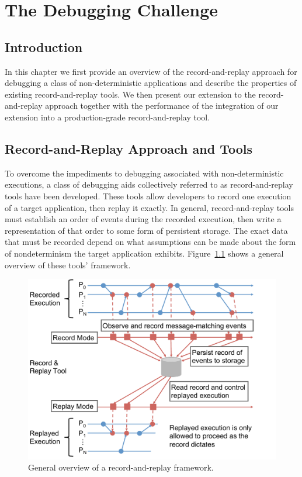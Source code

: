 \chapter{The Debugging Challenge} \label{chap3}

\section{Introduction}

In this chapter we first provide an overview of the record-and-replay
approach for debugging a class of non-deterministic applications and
describe the properties of existing record-and-replay tools. We then
present our extension to the record-and-replay approach together with
the performance of the integration of our extension into a
production-grade record-and-replay tool.

\section{Record-and-Replay Approach and Tools} 

To overcome the impediments to debugging associated with
non-deterministic executions, a class of debugging aids collectively
referred to as record-and-replay tools have been developed. These
tools allow developers to record one execution of a target
application, then replay it exactly. In general, record-and-replay
tools must establish an order of events during the recorded execution,
then write a representation of that order to some form of persistent
storage. The exact data that must be recorded depend on what
assumptions can be made about the form of nondeterminism the target
application exhibits. Figure~\ref{fig:rrframework} shows a general
overview of these tools' framework.
\begin{figure}[!ht]
    \centering
    \includegraphics[width=0.8\linewidth]{chapter_3_figures/rrframework.pdf}
    \caption{General overview of a record-and-replay framework.}
    \label{fig:rrframework}
\end{figure}

